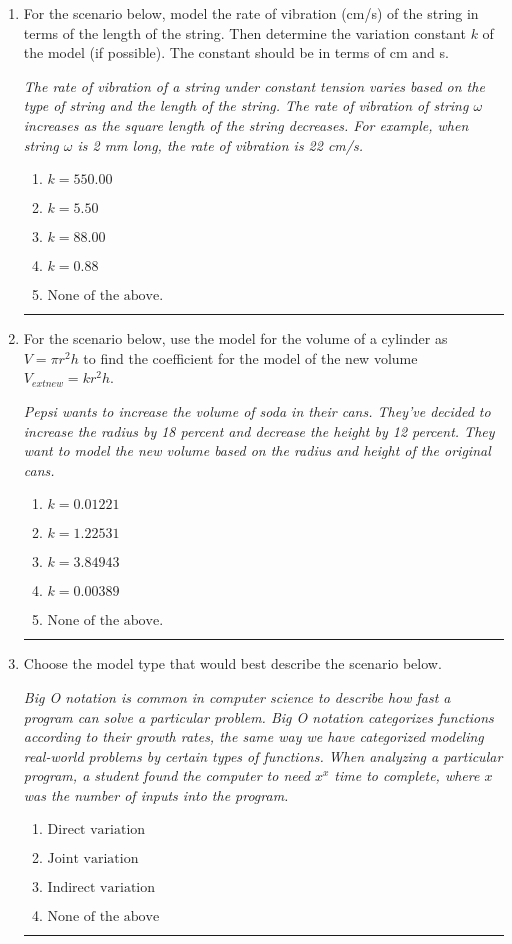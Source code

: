 \documentclass[14pt]{extbook}
\newcommand{\litem}[1]{\item#1\hspace*{-1cm}\rule{\textwidth}{0.4pt}}
\begin{document}
\begin{enumerate}
\litem{
For the scenario below, model the rate of vibration (cm/s) of the string in terms of the length of the string. Then determine the variation constant $k$ of the model (if possible). The constant should be in terms of cm and s.
\begin{center}
    \textit{ The rate of vibration of a string under constant tension varies based on the type of string and the length of the string. The rate of vibration of string $\omega$ increases as the square length of the string decreases. For example, when string $\omega$ is 2 mm long, the rate of vibration is 22 cm/s. }
\end{center}
\begin{enumerate}[label=\Alph*.]
\item \( k = 550.00 \)
\item \( k = 5.50 \)
\item \( k = 88.00 \)
\item \( k = 0.88 \)
\item \( \text{None of the above.} \)

\end{enumerate} }
\litem{
For the scenario below, use the model for the volume of a cylinder as $V = \pi r^2 h$ to find the coefficient for the model of the new volume $V_{	ext{new}} = k r^2 h$.
\begin{center}
    \textit{ Pepsi wants to increase the volume of soda in their cans. They've decided to increase the radius by 18 percent and decrease the height by 12 percent. They want to model the new volume based on the radius and height of the original cans. }
\end{center}
\begin{enumerate}[label=\Alph*.]
\item \( k = 0.01221 \)
\item \( k = 1.22531 \)
\item \( k = 3.84943 \)
\item \( k = 0.00389 \)
\item \( \text{None of the above.} \)

\end{enumerate} }
\litem{
Choose the model type that would best describe the scenario below.
\begin{center}
    \textit{ Big O notation is common in computer science to describe how fast a program can solve a particular problem. Big O notation categorizes functions according to their growth rates, the same way we have categorized modeling real-world problems by certain types of functions. When analyzing a particular program, a student found the computer to need $x^x$ time to complete, where $x$ was the number of inputs into the program. }
\end{center}
\begin{enumerate}[label=\Alph*.]
\item \( \text{Direct variation} \)
\item \( \text{Joint variation} \)
\item \( \text{Indirect variation} \)
\item \( \text{None of the above} \)


\end{enumerate}}
\end{enumerate}
\end{document}
